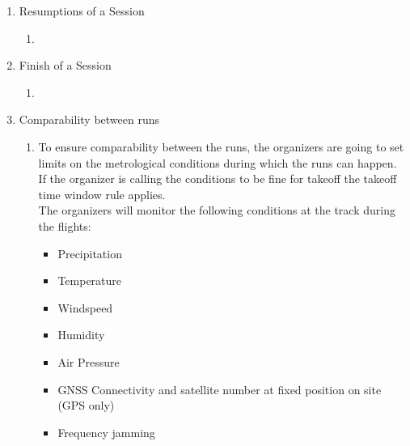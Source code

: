 \begin{enumerate}
    \item{Resumptions of a Session }
    \begin{enumerate}
      \item 
    \end{enumerate}

    \item{Finish of a Session}
    \begin{enumerate}
      \item 
    \end{enumerate}

    \item{Comparability between runs}
    \begin{enumerate}
      \item To ensure comparability between the runs, the organizers are going to set limits on the metrological conditions during which the runs can happen. If the organizer is calling the conditions to be fine for takeoff the takeoff time window rule applies. \\
      The organizers will monitor the following conditions at the track during the flights:
      \begin{itemize}
        \item Precipitation
        \item Temperature 
        \item Windspeed
        \item Humidity
        \item Air Pressure
        \item GNSS Connectivity and satellite number at fixed position on site (GPS only) 
        \item Frequency jamming
      \end{itemize}

    \end{enumerate}
  
\end{enumerate}



